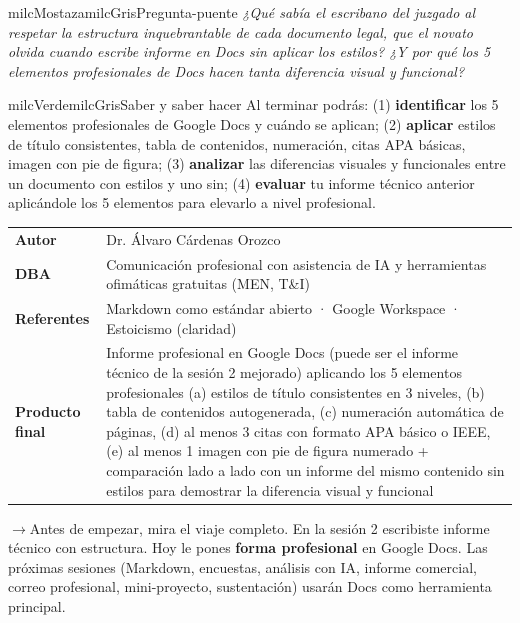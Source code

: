 \documentclass[11pt,letterpaper]{article}
\newcommand{\puente}[1]{%
  \begin{puentebox}%
    \textcolor{milcGradeDark}{$\rightarrow$}\hspace{2mm}#1%
  \end{puentebox}%
}
\begin{document}
\begin{softbox}{milcMostaza}{milcGris}{Pregunta-puente}
\textit{¿Qué sabía el escribano del juzgado al respetar la estructura inquebrantable de cada documento legal, que el novato olvida cuando escribe informe en Docs sin aplicar los estilos? ¿Y por qué los 5 elementos profesionales de Docs hacen tanta diferencia visual y funcional?}
\end{softbox}

\begin{softbox}{milcVerde}{milcGris}{Saber y saber hacer}
Al terminar podrás: (1) \textbf{identificar} los 5 elementos profesionales de Google Docs y cuándo se aplican; (2) \textbf{aplicar} estilos de título consistentes, tabla de contenidos, numeración, citas APA básicas, imagen con pie de figura; (3) \textbf{analizar} las diferencias visuales y funcionales entre un documento con estilos y uno sin; (4) \textbf{evaluar} tu informe técnico anterior aplicándole los 5 elementos para elevarlo a nivel profesional.
\end{softbox}



\small
\begin{tabularx}{\textwidth}{>{\bfseries}p{3.0cm}Y}
Autor & Dr. Álvaro Cárdenas Orozco\\
DBA & Comunicación profesional con asistencia de IA y herramientas ofimáticas gratuitas (MEN, T\&I)\\
Referentes & Markdown como estándar abierto · Google Workspace · Estoicismo (claridad)\\
Producto final & Informe profesional en Google Docs (puede ser el informe técnico de la sesión 2 mejorado) aplicando los 5 elementos profesionales (a) estilos de título consistentes en 3 niveles, (b) tabla de contenidos autogenerada, (c) numeración automática de páginas, (d) al menos 3 citas con formato APA básico o IEEE, (e) al menos 1 imagen con pie de figura numerado + comparación lado a lado con un informe del mismo contenido sin estilos para demostrar la diferencia visual y funcional\\
\end{tabularx}
\normalsize

\puente{Antes de empezar, mira el viaje completo. En la sesión 2 escribiste informe técnico con estructura. Hoy le pones \textbf{forma profesional} en Google Docs. Las próximas sesiones (Markdown, encuestas, análisis con IA, informe comercial, correo profesional, mini-proyecto, sustentación) usarán Docs como herramienta principal.}
\end{document}
